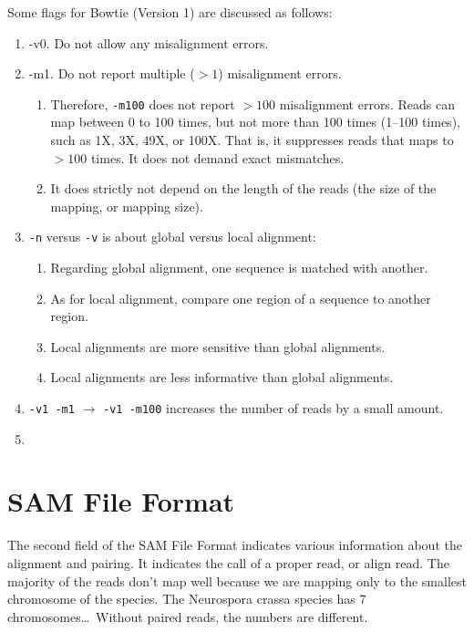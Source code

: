 Some flags for Bowtie (Version 1) are discussed as follows: \vspace{-0.3cm}
\begin{enumerate} \itemsep -4pt
\item -v0. Do not allow any misalignment errors.
\item -m1. Do not report multiple ($> 1$) misalignment errors. \vspace{-0.3cm}
	\begin{enumerate} \itemsep -2pt
	\item Therefore, {\tt -m100} does not report $> 100$ misalignment errors. Reads can map between 0 to 100 times, but not more than 100 times (1--100 times), such as 1X, 3X, 49X, or 100X. That is, it suppresses reads that maps to $> 100$ times. It does not demand exact mismatches.
	\item It does strictly not depend on the length of the reads (the size of the mapping, or mapping size).
	\end{enumerate}
\item {\tt -n} versus {\tt -v} is about global versus local alignment: \vspace{-0.3cm}
	\begin{enumerate} \itemsep -2pt
	\item Regarding global alignment, one sequence is matched with another.
	\item As for local alignment, compare one region of a sequence to another region.
	\item Local alignments are more sensitive than global alignments.
	\item Local alignments are less informative than global alignments.
	\end{enumerate}
\item {\tt -v1 -m1} $\rightarrow$ {\tt -v1 -m100} increases the number of reads by a small amount.
\item 
\end{enumerate}





\section{SAM File Format}
\label{sec:SAMFileFormat}

The second field of the SAM File Format indicates various information about the alignment and pairing. It indicates the call of a proper read, or align read. The majority of the reads don't map well because we are mapping only to the smallest chromosome of the species. The Neurospora crassa species has 7 chromosomes\dots\ Without paired reads, the numbers are different.

